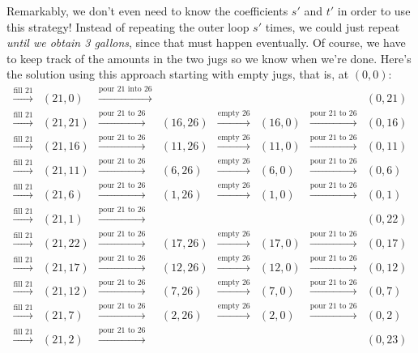 Remarkably, we don't even need to know the coefficients $s'$ and $t'$
in order to use this strategy!  Instead of repeating the outer loop
$s'$ times, we could just repeat \emph{until we obtain 3 gallons},
since that must happen eventually.  Of course, we have to keep track
of the amounts in the two jugs so we know when we're done.  Here's the
solution using this approach starting with empty jugs, that is, at
$(0,0)$:
\[
\begin{array}{cccccccc}
\xrightarrow{\text{fill 21}} & (21,0)& \xrightarrow{\text{pour 21 into
    26}} & & & &&(0,21)\\
\xrightarrow{\text{fill 21}} & (21,21)&
\xrightarrow{\text{pour 21 to 26}} & (16,26)& \xrightarrow{\text{empty
    26}} & (16,0)& \xrightarrow{\text{pour 21 to 26}} &
(0,16)\\
\xrightarrow{\text{fill 21}} & (21,16)&
\xrightarrow{\text{pour 21 to 26}} & (11,26)& \xrightarrow{\text{empty
    26}} & (11,0)& \xrightarrow{\text{pour 21 to 26}} &
(0,11)\\
\xrightarrow{\text{fill 21}} & (21,11)&
\xrightarrow{\text{pour 21 to 26}} & (6,26)& \xrightarrow{\text{empty
    26}} & (6,0)& \xrightarrow{\text{pour 21 to 26}} &
(0,6)\\
\xrightarrow{\text{fill 21}} & (21,6)& \xrightarrow{\text{pour
    21 to 26}} & (1,26)& \xrightarrow{\text{empty 26}} & (1,0)&
\xrightarrow{\text{pour 21 to 26}} & (0,1)\\
\xrightarrow{\text{fill
    21}} & (21,1)& \xrightarrow{\text{pour 21 to 26}} &&&&&
(0,22)\\
\xrightarrow{\text{fill 21}} & (21,22)&
\xrightarrow{\text{pour 21 to 26}} & (17,26)& \xrightarrow{\text{empty
    26}} & (17,0)& \xrightarrow{\text{pour 21 to 26}} &
(0,17)\\
\xrightarrow{\text{fill 21}} & (21,17)&
\xrightarrow{\text{pour 21 to 26}} & (12,26)& \xrightarrow{\text{empty
    26}} & (12,0)& \xrightarrow{\text{pour 21 to 26}} &
(0,12)\\
\xrightarrow{\text{fill 21}} & (21,12)&
\xrightarrow{\text{pour 21 to 26}} & (7,26)& \xrightarrow{\text{empty
    26}} & (7,0)& \xrightarrow{\text{pour 21 to 26}} &
(0,7)\\
\xrightarrow{\text{fill 21}} & (21,7)& \xrightarrow{\text{pour
    21 to 26}} & (2,26)& \xrightarrow{\text{empty 26}} & (2,0)&
\xrightarrow{\text{pour 21 to 26}} & (0,2)\\
\xrightarrow{\text{fill
    21}} & (21,2)& \xrightarrow{\text{pour 21 to 26}} &
&&&&(0,23)\\

\end{array}\]
